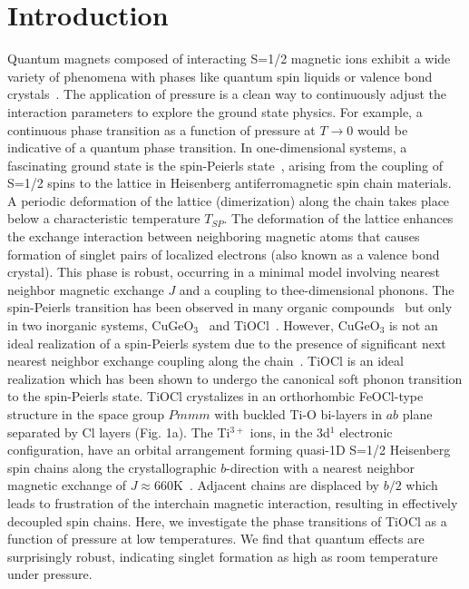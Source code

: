 \documentclass[preprint,superscriptaddress,amsmath,amssymb,aps,prl]{revtex4-1}
\begin{document}
\section*{Introduction}

Quantum magnets composed of interacting S=1/2 magnetic ions exhibit a wide variety of phenomena with phases like quantum spin liquids or valence bond crystals~\cite{Anderson1973}. The application of pressure is a clean way to continuously adjust the interaction parameters to explore the ground state physics. For example, a continuous phase transition as a function of pressure at $T\rightarrow$0 would be indicative of a quantum phase transition. In one-dimensional systems, a fascinating ground state is the spin-Peierls state~\cite{Pytte1974}, arising from the coupling of S=1/2 spins to the lattice in Heisenberg antiferromagnetic spin chain materials. A periodic deformation of the lattice (dimerization) along the chain takes place below a characteristic temperature $T_{SP}$. The deformation of the lattice enhances the exchange interaction between neighboring magnetic atoms that causes formation of singlet pairs of localized electrons (also known as a valence bond crystal). This phase is robust, occurring in a minimal model involving nearest neighbor magnetic exchange $J$ and a coupling to thee-dimensional phonons. The spin-Peierls transition has been observed in many organic compounds~\cite{Bray1975,Jacobs1976,Huizinga1979} but only in two inorganic systems, CuGeO$_{3}$~\cite{Hase1993} and TiOCl~\cite{Seidel2003,Abel2007}. However, CuGeO$_{3}$ is not an ideal realization of a spin-Peierls system due to the presence of significant next nearest neighbor exchange coupling along the chain~\cite{Riera1995}. TiOCl is an ideal realization which has been shown to undergo the canonical soft phonon transition to the spin-Peierls state.\cite{Abel2007} TiOCl crystalizes in an orthorhombic FeOCl-type structure in the space group $Pmmm$ with buckled Ti-O bi-layers in $ab$ plane separated by Cl layers (Fig. 1a). The Ti$^{3+}$ ions, in the 3d$^{1}$ electronic configuration, have an orbital arrangement forming quasi-1D S=1/2 Heisenberg spin chains along the crystallographic $b$-direction with a nearest neighbor magnetic exchange of $J\approx$660K~\cite{Seidel2003}. Adjacent chains are displaced by $b/2$ which leads to frustration of the interchain magnetic interaction, resulting in effectively decoupled spin chains. Here, we investigate the phase transitions of TiOCl as a function of pressure at low temperatures. We find that quantum effects are surprisingly robust, indicating singlet formation as high as room temperature under pressure.
\end{document}
